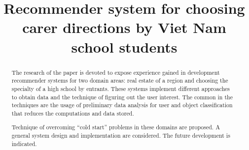 \documentclass[conference,a4]{IEEEtran}
\begin{document}

\title{Recommender system for choosing carer directions by Viet Nam school students}

\author{%
}

\maketitle
\begin{abstract}
  The research of the paper is devoted to expose experience gained in development recommender systems for two domain areas: real estate of a region and choosing the specialty of a high school by entrants. These systems implement different approaches to obtain data and the technique of figuring out the user interest. The common in the techniques are the usage of preliminary data analysis for user and object classification that reduces the computations and data stored. %

Technique of overcoming ``cold start'' problems in these domains are proposed.  A general system design and implementation are considered.  The future development is indicated.

\end{abstract}
\end{document}
